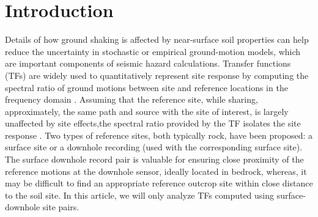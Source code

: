 \section{Introduction} \label{etf:intro}
Details of how ground shaking is affected by near-surface soil properties can help reduce the uncertainty in stochastic or empirical ground-motion models, which are important components of seismic hazard calculations. Transfer functions (TFs) are widely used to quantitatively represent site response by computing the spectral ratio of ground motions between site and reference locations in the frequency domain . Assuming that the reference site, while sharing, approximately, the same path and source with the site of interest, is largely unaffected by site effects,the spectral ratio provided by the TF isolates the site response \citep{borcherdtEffectsLocalGeology1970}. Two types of reference sites, both typically rock, have been proposed: a surface site or a downhole recording (used with the corresponding surface site). The surface downhole record pair is valuable for ensuring close proximity of the reference motions at the downhole sensor, ideally located in bedrock, whereas, it may be difficult to find an appropriate reference outcrop site within close distance to the soil site. In this article, we will only analyze TFs computed using surface-downhole site pairs.


